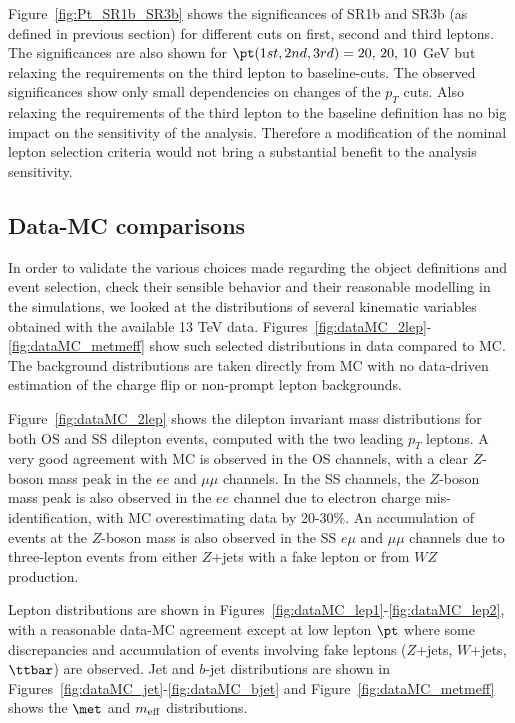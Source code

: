 Figure~\ref{fig:Pt_SR1b_SR3b} shows the significances of SR1b and SR3b (as defined in previous section) for different \pt cuts on first, second and third leptons. 
The significances are also shown for $\pt({\text 1st, 2nd, 3rd}) = 20, \, 20, \, 10 $ GeV but relaxing the requirements on the third lepton to baseline-cuts. 
The observed significances show only small dependencies on changes of the $p_T$ cuts. 
Also relaxing the requirements of the third lepton to the baseline definition has no big impact on the sensitivity of the analysis. 
Therefore a modification of the nominal lepton selection criteria would not bring a substantial benefit to the analysis sensitivity. 


\subsection{Data-MC comparisons}

In order to validate the various choices made regarding the object definitions and event selection, 
check their sensible behavior and their reasonable modelling in the simulations, 
we looked at the distributions of several kinematic variables obtained with the available 13 TeV data. 
Figures~\ref{fig:dataMC_2lep}-\ref{fig:dataMC_metmeff} show such selected distributions in data compared to MC. The background distributions are taken directly from MC with no data-driven estimation of the charge flip or non-prompt lepton backgrounds.

Figure~\ref{fig:dataMC_2lep} shows the dilepton invariant mass distributions for both OS and SS dilepton events, 
computed with the two leading $p_T$ leptons. 
A very good agreement with MC is observed in the OS channels, with a clear $Z$-boson mass peak in the $ee$ and $\mu\mu$ channels. 
In the SS channels, the $Z$-boson mass peak is also observed in the $ee$ channel due to electron charge mis-identification, with MC overestimating data by 20-30\%. 
An accumulation of events at the $Z$-boson mass is also observed in the SS $e\mu$ and $\mu\mu$ channels due to three-lepton events 
from either $Z$+jets with a fake lepton or from $WZ$ production.  

Lepton distributions are shown in Figures~\ref{fig:dataMC_lep1}-\ref{fig:dataMC_lep2}, with a reasonable data-MC agreement except at low lepton $\pt$ where some discrepancies and accumulation of events involving fake leptons ($Z$+jets, $W$+jets, $\ttbar$) are observed. Jet and $b$-jet distributions are shown in Figures~\ref{fig:dataMC_jet}-\ref{fig:dataMC_bjet} and Figure~\ref{fig:dataMC_metmeff} shows the $\met$ and $m_{\rm eff}$ distributions.

